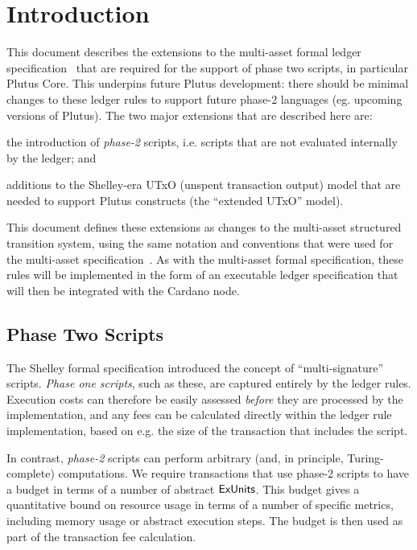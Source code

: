 \section{Introduction}

This document describes the extensions to the multi-asset formal ledger specification~\cite{shelley_ma_spec} that are
required for the support of phase two scripts, in particular Plutus Core. This underpins future Plutus development: there should be minimal changes to these ledger rules to support future phase-2 languages (eg. upcoming versions of Plutus).
%
The two major extensions that are described here are:

\begin{inparaenum}
\item
the introduction
of \emph{phase-2} scripts, i.e. scripts that are not evaluated internally by the ledger; and
\item
  additions to the Shelley-era UTxO (unspent transaction output) model that are needed to support Plutus
  constructs (the ``extended UTxO'' model).
\end{inparaenum}

This document defines these extensions as changes to the multi-asset structured transition system,
using the same notation and conventions that were used for the multi-asset specification~\cite{shelley_ma_spec}.
As with the multi-asset formal specification, these rules will be implemented in the form of an executable ledger specification that will then be
integrated with the Cardano node.

\subsection{Phase Two Scripts}

The Shelley formal specification introduced the concept of ``multi-signature'' scripts.
\emph{Phase one scripts}, such as these, are captured entirely by the ledger rules.
Execution costs can therefore be easily assessed \emph{before} they are processed by the implementation,
and any fees can be calculated directly within the ledger rule implementation,
based on e.g. the size of the transaction that includes the script.

In contrast, \emph{phase-2} scripts can perform arbitrary
(and, in principle, Turing-complete) computations.
We require transactions that use phase-2 scripts
to have a budget in terms of a number of abstract $\mathsf{ExUnits}$.
This budget gives a quantitative bound on resource usage in terms of a number of specific metrics, including memory usage or abstract execution steps.
The budget is then used as part of the transaction fee calculation.

